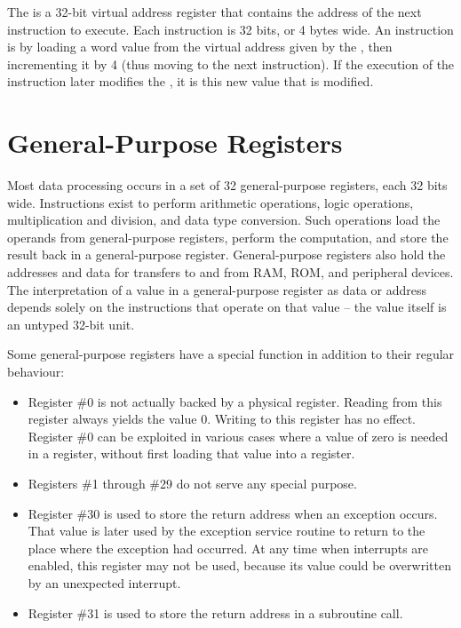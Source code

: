 The \pc is a 32-bit virtual address register that contains the address of the next instruction to execute. Each instruction is 32 bits, or 4 bytes wide. An instruction is  by loading a word value from the virtual address given by the \pcx, then incrementing it by 4 (thus moving to the next instruction). If the execution of the instruction later modifies the \pcx, it is this new value that is modified.

\section{General-Purpose Registers}

Most data processing occurs in a set of 32 general-purpose registers, each 32 bits wide. Instructions exist to perform arithmetic operations, logic operations, multiplication and division, and data type conversion. Such operations load the operands from general-purpose registers, perform the computation, and store the result back in a general-purpose register. General-purpose registers also hold the addresses and data for transfers to and from RAM, ROM, and peripheral devices. The interpretation of a value in a general-purpose register as data or address depends solely on the instructions that operate on that value -- the value itself is an untyped 32-bit unit.

Some general-purpose registers have a special function in addition to their
regular behaviour:
\begin{itemize}
\item Register \#0 is not actually backed by a physical register. Reading from
this register always yields the value 0. Writing to this register has no
effect. Register \#0 can be exploited in various cases where a value of zero is
needed in a register, without first loading that value into a register.
\item Registers \#1 through \#29 do not serve any special purpose.
\item Register \#30 is used to store the return address when an exception occurs.
That value is later used by the exception service routine to return to the
place where the exception had occurred. At any time when interrupts are
enabled, this register may not be used, because its value could be overwritten
by an unexpected interrupt.
\item Register \#31 is used to store the return address in a subroutine call.
\end{itemize}

